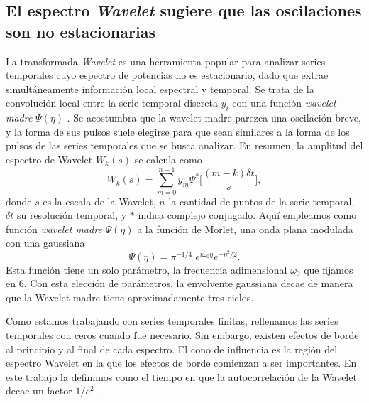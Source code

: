 \documentclass[./main.tex]{subfiles}
\begin{document}
\subsection{El espectro \textit{Wavelet} sugiere que las oscilaciones son no estacionarias}

La transformada \textit{Wavelet} es una herramienta popular para analizar series temporales cuyo espectro de potencias no es estacionario, dado que extrae simultáneamente información local espectral y temporal.  Se trata de la convolución local entre la serie temporal discreta $y_i$ con una función \textit{wavelet madre} $\Psi(\eta)$ \cite{Torrence1998}. Se acostumbra que la wavelet madre parezca una oscilación breve, y la forma de sus pulsos suele elegirse para que sean similares a la forma de los pulsos de las series temporales que se busca analizar. En resumen, la amplitud del espectro de Wavelet $W_k(s)$ se calcula como
\begin{equation}
    W_k(s) = \sum_{m=0}^{n-1} y_m \Psi^* \Big[ \frac{(m-k) \delta t}{s}\Big], 
 \end{equation}
donde $s$ es la escala de la Wavelet, $n$ la cantidad de puntos de la serie temporal, $\delta t$ su resolución temporal,  y $*$ indica complejo conjugado. Aquí empleamos como función \textit{wavelet madre} $\Psi(\eta)$ a la función de Morlet, una onda plana modulada con una gaussiana
\begin{equation}
 \Psi(\eta) = \pi^{-1/4} \; e^{i\omega_0 \eta } e^{-\eta^2 / 2}.
\end{equation}
Esta función tiene un solo parámetro, la frecuencia adimensional $\omega_0$ que fijamos en $6$. Con esta elección de parámetros, la envolvente gaussiana decae de manera que la Wavelet madre tiene aproximadamente tres ciclos. 


Como estamos trabajando con series temporales finitas, rellenamos las series temporales con ceros cuando fue necesario. Sin embargo, existen efectos de borde al principio y al final de cada espectro. El cono de influencia es la región del espectro Wavelet en la que los efectos de borde comienzan a ser importantes. En este trabajo la definimos como el tiempo en que la autocorrelación de la Wavelet decae un factor $1/e^2$ \cite{Torrence1998}. 
\end{document}
